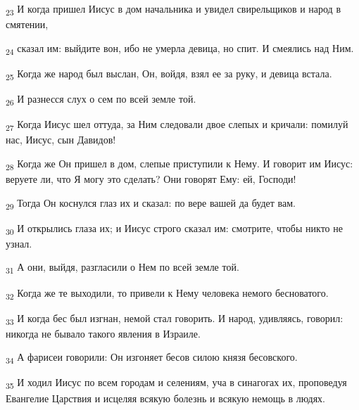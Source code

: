 \begin{tcolorbox}
\textsubscript{23} И когда пришел Иисус в дом начальника и увидел свирельщиков и народ в смятении,
\end{tcolorbox}
\begin{tcolorbox}
\textsubscript{24} сказал им: выйдите вон, ибо не умерла девица, но спит. И смеялись над Ним.
\end{tcolorbox}
\begin{tcolorbox}
\textsubscript{25} Когда же народ был выслан, Он, войдя, взял ее за руку, и девица встала.
\end{tcolorbox}
\begin{tcolorbox}
\textsubscript{26} И разнесся слух о сем по всей земле той.
\end{tcolorbox}
\begin{tcolorbox}
\textsubscript{27} Когда Иисус шел оттуда, за Ним следовали двое слепых и кричали: помилуй нас, Иисус, сын Давидов!
\end{tcolorbox}
\begin{tcolorbox}
\textsubscript{28} Когда же Он пришел в дом, слепые приступили к Нему. И говорит им Иисус: веруете ли, что Я могу это сделать? Они говорят Ему: ей, Господи!
\end{tcolorbox}
\begin{tcolorbox}
\textsubscript{29} Тогда Он коснулся глаз их и сказал: по вере вашей да будет вам.
\end{tcolorbox}
\begin{tcolorbox}
\textsubscript{30} И открылись глаза их; и Иисус строго сказал им: смотрите, чтобы никто не узнал.
\end{tcolorbox}
\begin{tcolorbox}
\textsubscript{31} А они, выйдя, разгласили о Нем по всей земле той.
\end{tcolorbox}
\begin{tcolorbox}
\textsubscript{32} Когда же те выходили, то привели к Нему человека немого бесноватого.
\end{tcolorbox}
\begin{tcolorbox}
\textsubscript{33} И когда бес был изгнан, немой стал говорить. И народ, удивляясь, говорил: никогда не бывало такого явления в Израиле.
\end{tcolorbox}
\begin{tcolorbox}
\textsubscript{34} А фарисеи говорили: Он изгоняет бесов силою князя бесовского.
\end{tcolorbox}
\begin{tcolorbox}
\textsubscript{35} И ходил Иисус по всем городам и селениям, уча в синагогах их, проповедуя Евангелие Царствия и исцеляя всякую болезнь и всякую немощь в людях.
\end{tcolorbox}
